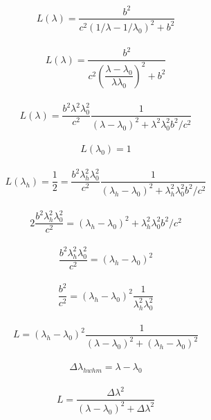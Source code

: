 \begin{align}
	L(\lambda) = \dfrac{b^2}{ c^2(1/\lambda - 1/\lambda_0)^2 + b^2}
\end{align}

\begin{align}
	L(\lambda) = \dfrac{b^2}{ c^2 \left(\dfrac{\lambda - \lambda_0}{\lambda  \lambda_0}\right)^2 + b^2}
\end{align}

\begin{align}
	L(\lambda) = \dfrac{b^2 \lambda^2 \lambda_0^2}{c^2}
				\dfrac{1}{\left(\lambda - \lambda_0\right)^2 + \lambda^2 \lambda_0^2 b^2/c^2}
\end{align}

\begin{align}
	L(\lambda_0) = 1
\end{align}

\begin{align}
	L(\lambda_h) = \dfrac{1}{2} = \dfrac{b^2 \lambda_h^2 \lambda_0^2}{c^2}
\dfrac{1}{\left(\lambda_h - \lambda_0\right)^2 + \lambda_h^2 \lambda_0^2 b^2/c^2}
\end{align}

\begin{align}
	 2 \dfrac{b^2 \lambda_h^2 \lambda_0^2}{c^2}
				= \left(\lambda_h - \lambda_0\right)^2 + \lambda_h^2 \lambda_0^2 b^2/c^2
\end{align}

\begin{align}
	\dfrac{b^2 \lambda_h^2 \lambda_0^2}{c^2}
		= \left(\lambda_h - \lambda_0\right)^2
\end{align}

\begin{align}
	\dfrac{b^2}{c^2} = \left(\lambda_h - \lambda_0\right)^2 \dfrac{1}{\lambda_h^2 \lambda_0^2}
\end{align}

\begin{align}
	L = \left(\lambda_h - \lambda_0\right)^2 \dfrac{1}{\left(\lambda - \lambda_0\right)^2 + \left(\lambda_h - \lambda_0\right)^2}
\end{align}

\begin{align}
	\Delta \lambda_{hwhm} = \lambda - \lambda_0
\end{align}

\begin{align}
	L =   \dfrac{ \Delta \lambda^2}{\left(\lambda - \lambda_0\right)^2 + \Delta \lambda^2}
\end{align}

